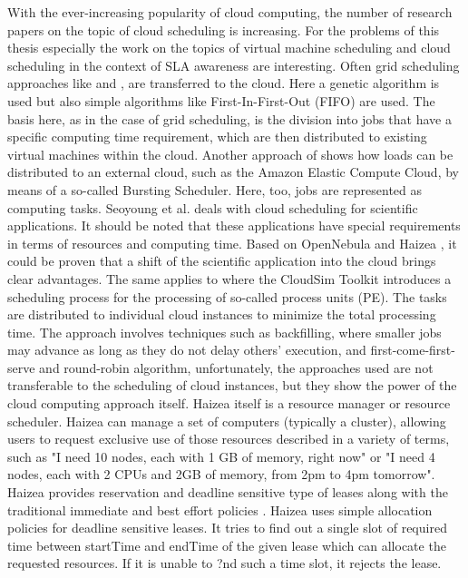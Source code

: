 With the ever-increasing popularity of cloud computing, the number of research papers on the topic of cloud scheduling is increasing. For the problems of this thesis especially the work on the topics of virtual machine scheduling and cloud scheduling in the context of SLA awareness are interesting. Often grid scheduling approaches like  \cite{ga-basedtask} and  \cite{deadlineawarecloud}, are transferred to the cloud. Here a genetic algorithm is used but also simple algorithms like First-In-First-Out (FIFO) are used. The basis here, as in the case of grid scheduling, is the division into jobs that have a specific computing time requirement, which are then distributed to existing virtual machines within the cloud. Another approach of  \cite{cloudbursting} shows how loads can be distributed to an external cloud, such as the Amazon Elastic Compute Cloud, by means of a so-called Bursting Scheduler. Here, too, jobs are represented as computing tasks. Seoyoung et al.  \cite{adaptablecloudscheduling} deals with cloud scheduling for scientific applications. It should be noted that these applications have special requirements in terms of resources and computing time. Based on OpenNebula and Haizea \cite{haizea}, it could be proven that a shift of the scientific application into the cloud brings clear advantages. The same applies to  \cite{twolevel} where the CloudSim Toolkit introduces a scheduling process for the processing of so-called process units (PE). The tasks are distributed to individual cloud instances to minimize the total processing time. The approach involves techniques such as backfilling, where smaller jobs may advance as long as they do not delay others' execution, and first-come-first-serve and round-robin algorithm, unfortunately, the approaches used are not transferable to the scheduling of cloud instances, but they show the power of the cloud computing approach itself. Haizea  \cite{haizea2} itself is a resource manager or resource scheduler. Haizea  can manage a set of computers (typically a cluster), allowing users to request exclusive use of those resources described in a variety of terms, such as "I need 10 nodes, each with 1 GB of memory, right now" or "I need 4 nodes, each with 2 CPUs and 2GB of memory, from 2pm to 4pm tomorrow". Haizea provides reservation and deadline sensitive type of leases along with the traditional immediate and best effort policies  \cite{haizea1}  \cite{haizea3}  \cite{haizea4}. Haizea uses simple allocation policies for deadline sensitive leases. It tries to find out a single slot of required time between startTime and endTime of the given lease which can allocate the requested resources. If it is unable to ?nd such a time slot, it rejects the lease. 


